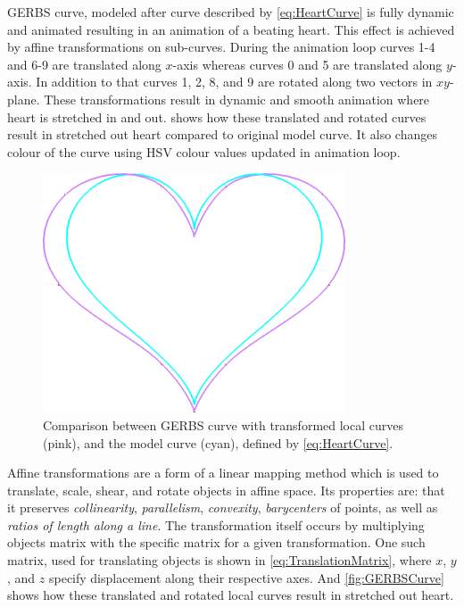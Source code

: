 \documentclass[a4paper,12pt]{extarticle}
\begin{document}
GERBS curve, modeled after curve described by \cref{eq:HeartCurve} is fully dynamic and animated resulting in an animation of a beating heart. This effect is achieved by affine transformations on sub-curves. During the animation loop curves 1-4 and 6-9 are translated along $x$-axis whereas curves 0 and 5 are translated along $y$-axis. In addition to that curves 1, 2, 8, and 9 are rotated along two vectors in $xy$-plane. These transformations result in dynamic and smooth animation where heart is stretched in and out.   shows how these translated and rotated curves result in stretched out heart compared to original model curve. It also changes colour of the curve using HSV colour values updated in animation loop.

\begin{figure}[H]
  \centering
  \includegraphics[width=0.8\textwidth]{CurveComparison.png}
  \caption{Comparison between GERBS curve with transformed local curves (pink), and the model curve (cyan), defined by \cref{eq:HeartCurve}.}
  \label{fig:CurveComparison}
\end{figure}

Affine transformations are a form of a linear mapping method which is used to translate, scale, shear, and rotate objects in affine space. Its properties are: that it preserves \emph{collinearity}, \emph{parallelism}, \emph{convexity}, \emph{barycenters} of points, as well as \emph{ratios of length along a line}. The transformation itself occurs by multiplying objects matrix with the specific matrix for a given transformation. One such matrix, used for translating objects is shown in \cref{eq:TranslationMatrix}, where $x$, $y$, and $z$ specify displacement along their respective axes. And \cref{fig:GERBSCurve} shows how these translated and rotated local curves result in stretched out heart.
\end{document}
